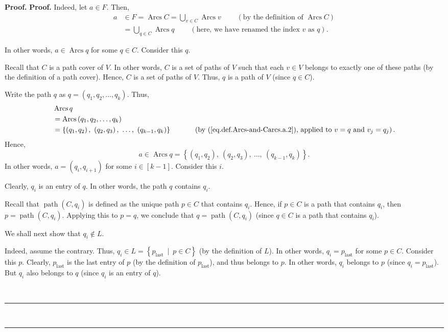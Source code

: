 \documentclass[numbers=enddot,12pt,final,onecolumn,notitlepage]{scrartcl}%
\numberwithin{exer}{section}
\theoremstyle{definition}
\newenvironment{proof}[1][Proof]{\noindent\textbf{#1.} }{\ \rule{0.5em}{0.5em}}
\let\cupnonlimits\bigcup
\renewcommand{\bigcup}{\cupnonlimits\limits}
\newenvironment{verlong}{}{}
\begin{document}
\begin{verlong}
\begin{proof}
\begin{proof}
Indeed, let $a\in F$. Then,
\begin{align*}
a  &  \in F=\operatorname*{Arcs}C=\bigcup_{v\in C}\operatorname*{Arcs}%
v\ \ \ \ \ \ \ \ \ \ \left(  \text{by the definition of }\operatorname*{Arcs}%
C\right) \\
&  =\bigcup_{q\in C}\operatorname*{Arcs}q\ \ \ \ \ \ \ \ \ \ \left(
\text{here, we have renamed the index }v\text{ as }q\right)  .
\end{align*}


In other words, $a\in\operatorname*{Arcs}q$ for some $q\in C$. Consider this
$q$.

Recall that $C$ is a path cover of $V$. In other words, $C$ is a set of paths
of $V$ such that each $v\in V$ belongs to exactly one of these paths (by the
definition of a path cover). Hence, $C$ is a set of paths of $V$. Thus, $q$ is
a path of $V$ (since $q\in C$).

Write the path $q$ as $q=\left(  q_{1},q_{2},\ldots,q_{k}\right)  $. Thus,%
\begin{align*}
&  \operatorname*{Arcs}q\\
&  =\operatorname*{Arcs}\left(  q_{1},q_{2},\ldots,q_{k}\right) \\
&  =\left\{  \left(  q_{1},q_{2}\right)  ,\ \left(  q_{2},q_{3}\right)
,\ \ldots,\ \left(  q_{k-1},q_{k}\right)  \right\}
\ \ \ \ \ \ \ \ \ \ \left(  \text{by (\ref{eq.def.Arcs-and-Carcs.a.2}),
applied to }v=q\text{ and }v_{j}=q_{j}\right)  .
\end{align*}
Hence,%
\[
a\in\operatorname*{Arcs}q=\left\{  \left(  q_{1},q_{2}\right)  ,\ \left(
q_{2},q_{3}\right)  ,\ \ldots,\ \left(  q_{k-1},q_{k}\right)  \right\}  .
\]
In other words, $a=\left(  q_{i},q_{i+1}\right)  $ for some $i\in\left[
k-1\right]  $. Consider this $i$.

Clearly, $q_{i}$ is an entry of $q$. In other words, the path $q$ contains
$q_{i}$.

Recall that $\operatorname*{path}\left(  C,q_{i}\right)  $ is defined as the
unique path $p\in C$ that contains $q_{i}$. Hence, if $p\in C$ is a path that
contains $q_{i}$, then $p=\operatorname*{path}\left(  C,q_{i}\right)  $.
Applying this to $p=q$, we conclude that $q=\operatorname*{path}\left(
C,q_{i}\right)  $ (since $q\in C$ is a path that contains $q_{i}$).

We shall next show that $q_{i}\notin L$.

Indeed, assume the contrary. Thus, $q_{i}\in L=\left\{
p_{\operatorname*{last}}\ \mid\ p\in C\right\}  $ (by the definition of $L$).
In other words, $q_{i}=p_{\operatorname*{last}}$ for some $p\in C$. Consider
this $p$. Clearly, $p_{\operatorname*{last}}$ is the last entry of $p$ (by the
definition of $p_{\operatorname*{last}}$), and thus belongs to $p$. In other
words, $q_{i}$ belongs to $p$ (since $q_{i}=p_{\operatorname*{last}}$). But
$q_{i}$ also belongs to $q$ (since $q_{i}$ is an entry of $q$).


\end{proof}
\end{proof}
\end{verlong}
\end{document}

